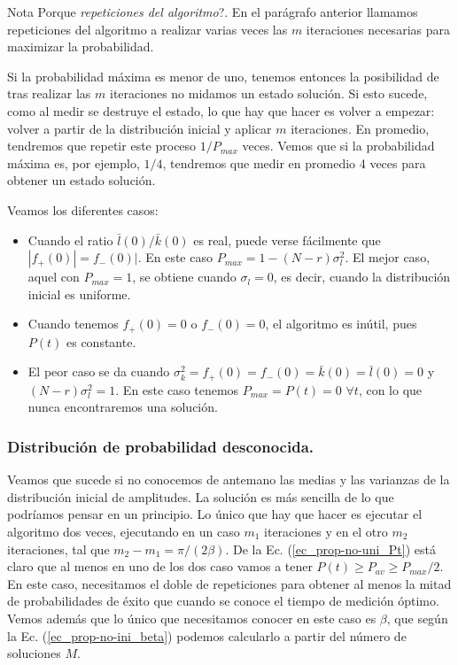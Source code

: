 \documentclass[a4paper,11pt]{article} %
\numberwithin{equation}{section}
\begin{document}
\begin{mybox}{Nota}
Porque \textit{repeticiones del algoritmo}?. En el parágrafo anterior llamamos repeticiones del algoritmo a realizar varias veces las $m$ iteraciones necesarias para maximizar la probabilidad. 

Si la probabilidad máxima es menor de uno, tenemos entonces la posibilidad de tras realizar las $m$ iteraciones no midamos un estado solución. Si esto sucede, como al medir se destruye el estado, lo que hay que hacer es volver a empezar: volver a partir de la distribución inicial y aplicar $m$ iteraciones. En promedio, tendremos que repetir este proceso $1/P_{max}$ veces. Vemos que si la probabilidad máxima es, por ejemplo, $1/4$, tendremos que medir en promedio 4 veces para obtener un estado solución. 
\end{mybox}

Veamos los diferentes casos:
\begin{itemize}
	\item Cuando el ratio $\bar{l}(0)/\bar{k}(0)$ es real, puede verse fácilmente que $|f_+(0)| =f_{-}(0)|$. En este caso $P_{max} = 1-(N-r)\sigma_l^2$. El mejor caso, aquel con $P_{max}=1$, se obtiene cuando $\sigma_l=0$, es decir, cuando la distribución inicial es uniforme.
	
	\item Cuando tenemos $f_+(0)=0$ o $f_-(0)=0$, el algoritmo es inútil, pues $P(t)$ es constante.
	
	\item El peor caso se da cuando $\sigma_k^2=f_+(0)=f_-(0)=\bar{k} (0)=\bar{l}(0)=0$ y $(N-r)\sigma_l^2=1$. En este caso tenemos $P_{max}=P(t)=0$ $\forall t$, con lo que nunca encontraremos una solución.
	
\end{itemize}

\subsubsection{Distribución de probabilidad desconocida.} \label{subsec_prop-no-uni_desconocida}

Veamos que sucede si no conocemos de antemano las medias y las varianzas de la distribución inicial de amplitudes. 
La solución es más sencilla de lo que podríamos pensar en un principio. Lo único que hay que hacer es ejecutar el algoritmo dos veces, ejecutando en un caso $m_1$ iteraciones y en el otro $m_2$ iteraciones, tal que $m_2-m_1=\pi/(2 \beta)$. De la Ec. (\ref{ec_prop-no-uni_Pt}) está claro que al menos en uno de los dos caso vamos a tener $P(t)\geq P_{av} \geq P_{max}/2$. En este caso, necesitamos el doble de repeticiones para obtener al menos la mitad de probabilidades de éxito que cuando se conoce el tiempo de medición óptimo. Vemos además que lo único que necesitamos conocer en este caso es $\beta$, que según la Ec. (\ref{ec_prop-no-ini_beta}) podemos calcularlo a partir del número de soluciones $M$.
\end{document}
